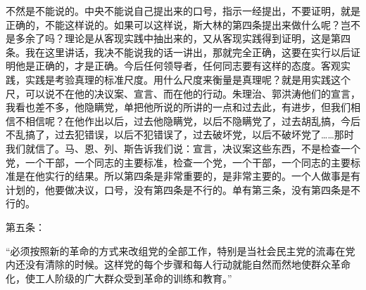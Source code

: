 不然是不能说的。中央不能说自己提出来的口号，指示一经提出，不要证明，就是正确的，不能这样说的。如果可以这样说，斯大林的第四条提出来做什么呢？岂不是多余了吗？理论是从客现实践中抽出来的，又从客现实践得到证明，这是第四条。我在这里讲话，我决不能说我的话一讲出，那就完全正确，这要在实行以后证明他是正确的，才是正确。今后任何领导者，任何同志要有这样的态度。客观实践，实践是考验真理的标准尺度。用什么尺度来衡量是真理呢？就是用实践这个尺，可以说不在他的决议案、宣言、而在他的行动。朱理治、郭洪涛他们的宣言，我看也差不多，他隐瞒党，单把他所说的所讲的一点和过去此，有进步，但我们相信不相信呢？在他作出以后，过去他隐瞒党，以后不隐瞒党了，过去胡乱搞，今后不乱搞了，过去犯错误，以后不犯错误了，过去破坏党，以后不破坏党了……那时我们就信了。马、恩、列、斯告诉我们说：宣言，决议案这些东西，不是检查一个党，一个干部，一个同志的主要标准，检查一个党，一个干部，一个同志的主要标准是在他实行的结果。所以第四条是非常重要的，是非常主要的。一个人做事是有计划的，他要做决议，口号，没有第四条是不行的。单有第三条，没有第四条是不行的。

第五条：

“必须按照新的革命的方式来改组党的全部工作，特别是当社会民主党的流毒在党内还没有清除的时候。这样党的每个步骤和每人行动就能自然而然地使群众革命化，使工人阶级的广大群众受到革命的训练和教育。”

